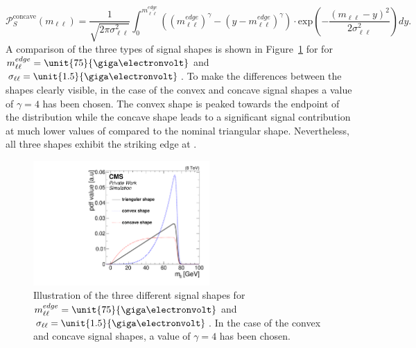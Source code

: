 \begin{equation}
\label{eq:concave}
 {\mathcal{P}}_{S}^{\text{concave}}(m_{\ell\ell}) = \frac{1}{\sqrt{2\pi\sigma_{\ell\ell}^2}} \int_{0}^{m_{\ell\ell}^{edge}} \left(\left(m_{\ell\ell}^{edge}\right)^{\gamma} -\left(y-m_{\ell\ell}^{edge}\right)^{\gamma}\right) \cdot \textrm{exp}\left( -\frac{(m_{\ell\ell}-y)^2}{2\sigma_{\ell\ell}^{2}}\right) dy.
\end{equation}
A comparison of the three types of signal shapes is shown in Figure~\ref{fig:mc:shapes} for for $m_{\ell\ell}^{edge} = \unit{75}{\giga\electronvolt}$ and $\sigma_{\ell\ell} = \unit{1.5}{\giga\electronvolt}$. To make the differences between the shapes clearly visible, in the case of the convex and concave signal shapes a value of $\gamma = 4$ has been chosen. The convex shape is peaked towards the endpoint of the distribution while the concave shape leads to a significant signal contribution at much lower values of \mll compared to the nominal triangular shape. Nevertheless, all three shapes exhibit the striking edge at \mlledge.
\begin{figure}[tbp]
\centering
  \includegraphics[width=0.6\textwidth]{plots/results/fit/shapes.pdf}
\caption{Illustration of the three different signal shapes for $m_{\ell\ell}^{edge} = \unit{75}{\giga\electronvolt}$ and $\sigma_{\ell\ell} = \unit{1.5}{\giga\electronvolt}$. In the case of the convex and concave signal shapes, a value of $\gamma = 4$ has been chosen.}
\label{fig:mc:shapes}
\end{figure}

